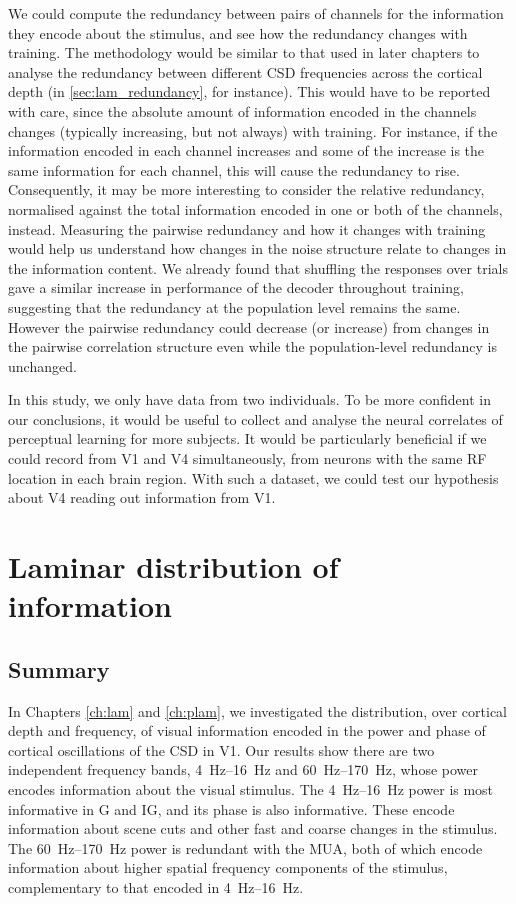 We could compute the redundancy between pairs of channels for the information they encode about the stimulus, and see how the redundancy changes with training.
The methodology would be similar to that used in later chapters to analyse the redundancy between different \ac{CSD} frequencies across the cortical depth (in \autoref{sec:lam_redundancy}, for instance).
This would have to be reported with care, since the absolute amount of information encoded in the channels changes (typically increasing, but not always) with training.
For instance, if the information encoded in each channel increases and some of the increase is the same information for each channel, this will cause the redundancy to rise.
Consequently, it may be more interesting to consider the relative redundancy, normalised against the total information encoded in one or both of the channels, instead.
Measuring the pairwise redundancy and how it changes with training would help us understand how changes in the noise structure relate to changes in the information content.
We already found that shuffling the responses over trials gave a similar increase in performance of the decoder throughout training, suggesting that the redundancy at the population level remains the same.
However the pairwise redundancy could decrease (or increase) from changes in the pairwise correlation structure even while the population-level redundancy is unchanged.

In this study, we only have data from two individuals.
To be more confident in our conclusions, it would be useful to collect and analyse the neural correlates of perceptual learning for more subjects.
It would be particularly beneficial if we could record from \ac{V1} and \ac{V4} simultaneously, from neurons with the same \ac{RF} location in each brain region.
With such a dataset, we could test our hypothesis about \ac{V4} reading out information from \ac{V1}.


\section{Laminar distribution of information}

\subsection{Summary}

In Chapters \ref{ch:lam} and \ref{ch:plam}, we investigated the distribution, over cortical depth and frequency, of visual information encoded in the power and phase of cortical oscillations of the \ac{CSD} in \ac{V1}.
Our results show there are two independent frequency bands, \SIrange{4}{16}{Hz} and \SIrange{60}{170}{Hz}, whose power encodes information about the visual stimulus.
The \SIrange{4}{16}{Hz} power is most informative in \ac{G} and \ac{IG}, and its phase is also informative.
These encode information about scene cuts and other fast and coarse changes in the stimulus.
The \SIrange{60}{170}{Hz} power is redundant with the \ac{MUA}, both of which encode information about higher spatial frequency components of the stimulus, complementary to that encoded in \SIrange{4}{16}{Hz}.

